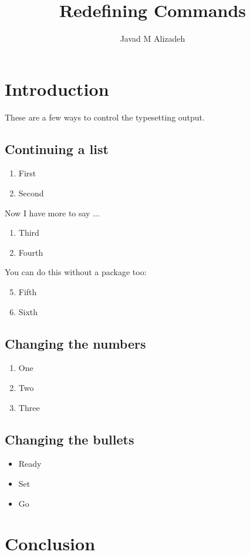 \documentclass{article}
\title{Redefining Commands}
\author{Javad M Alizadeh}
\date{}
\begin{document}
\maketitle
	
\section{Introduction}

These are a few ways to control the typesetting output.

\subsection{Continuing a list}

\begin{enumerate}
	\item First
	\item Second
\end{enumerate}	

Now I have more to say ...

\begin{enumerate}[resume]
	\item Third
	\item Fourth
\end{enumerate}

You can do this without a package too:

\begin{enumerate}
	\setcounter{enumi}{4}
	\item Fifth
	\item Sixth
\end{enumerate}

\subsection{Changing the numbers}

\renewcommand{\theenumi}{\Alph{enumi}}
\begin{enumerate}
	\item One
	\item Two
	\item Three
\end{enumerate}

\subsection{Changing the bullets}

\renewcommand{\labelitemi}{$\rightarrow$}
\begin{itemize}
	\item Ready
	\item Set
	\item Go
\end{itemize}
	
	
\section{Conclusion}
	
	
\end{document}
